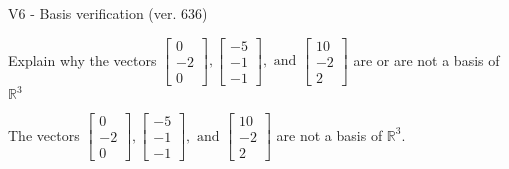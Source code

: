 \begin{exercise}
  \begin{exerciseTitle}V6 - Basis verification (ver. 636)\end{exerciseTitle}
  \begin{exerciseStatement}
    Explain why the vectors \(\left[\begin{array}{r}
0 \\
-2 \\
0
\end{array}\right] , \left[\begin{array}{r}
-5 \\
-1 \\
-1
\end{array}\right] , \text{ and } \left[\begin{array}{r}
10 \\
-2 \\
2
\end{array}\right]\) are or are not a basis of \(\mathbb{R}^3\)	


  \end{exerciseStatement}
  \begin{exerciseAnswer}
   The vectors \(\left[\begin{array}{r}
0 \\
-2 \\
0
\end{array}\right] , \left[\begin{array}{r}
-5 \\
-1 \\
-1
\end{array}\right] , \text{ and } \left[\begin{array}{r}
10 \\
-2 \\
2
\end{array}\right]\) 
  	 are not  a basis of \(\mathbb{R}^3\).
  


  \end{exerciseAnswer}
\end{exercise}